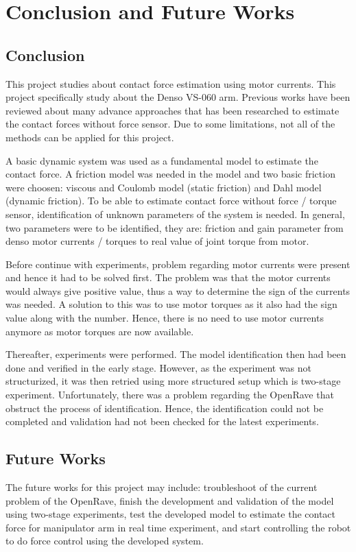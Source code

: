 \chapter{Conclusion and Future Works}
\section{Conclusion}
This project studies about contact force estimation using motor currents. This project specifically study about the Denso VS-060 arm. Previous works have been reviewed about many advance approaches that has been researched to estimate the contact forces without force sensor. Due to some limitations, not all of the methods can be applied for this project. 

A basic dynamic system was used as a fundamental model to estimate the contact force. A friction model was needed in the model and two basic friction were choosen: viscous and Coulomb model (static friction) and Dahl model (dynamic friction). To be able to estimate contact force without force / torque sensor, identification of unknown parameters of the system is needed. In general, two parameters were to be identified, they are: friction and gain parameter from denso motor currents / torques to real value of joint torque from motor. 

Before continue with experiments, problem regarding motor currents were present and hence it had to be solved first. The problem was that the motor currents would always give positive value, thus a way to determine the sign of the currents was needed. A solution to this was to use motor torques as it also had the sign value along with the number. Hence, there is no need to use motor currents anymore as motor torques are now available. 

Thereafter, experiments were performed. The model identification then had been done and verified in the early stage. However, as the experiment was not structurized, it was then retried using more structured setup which is two-stage experiment. Unfortunately, there was a problem regarding the OpenRave that obstruct the process of identification. Hence, the identification could not be completed and validation had not been checked for the latest experiments.

\section{Future Works}
The future works for this project may include: troubleshoot of the current problem of the OpenRave, finish the development and validation of the model using two-stage experiments, test the developed model to estimate the contact force for manipulator arm in real time experiment, and start controlling the robot to do force control using the developed system. 



